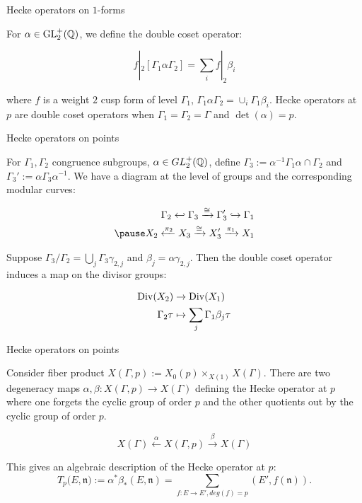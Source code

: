 \begin{frame}{Hecke operators on $1$-forms}

For $\alpha \in \operatorname{GL}_2^+(\mathbb{Q})$, we define the double coset operator:

\[
f|_2 [\Gamma_1 \alpha \Gamma_2] = \sum_i f|_2 \beta_i
\]

where $f$ is a weight $2$ cusp form of level $\Gamma_1$, $\Gamma_1 \alpha \Gamma_2 = \cup_i \Gamma_1 \beta_i$. Hecke operators at $p$ are double coset operators when $\Gamma_1= \Gamma_2 = \Gamma$ and $\det(\alpha) = p$.

\end{frame}

\begin{frame}{Hecke operators on points}

For $\Gamma_1, \Gamma_2$ congruence subgroups, $\alpha \in GL_2^+(\mathbb{Q}) $, define $\Gamma_3 := \alpha^{-1} \Gamma_1 \alpha \cap \Gamma_2$ and $\Gamma_3' := \alpha \Gamma_3 \alpha^{-1}$. \pause We have a diagram at the level of groups and the corresponding modular curves:

\begin{align*}
\Gamma_2 \hookleftarrow \Gamma_3 \xrightarrow{\cong} \Gamma_3' \hookrightarrow \Gamma_1 \\
\pause X_2 \xleftarrow{\pi_2} X_3 \xrightarrow{\cong} X_3' \xrightarrow{\pi_1} X_1
\end{align*}

\pause Suppose $\Gamma_3 / \Gamma_2 = \bigcup_j \Gamma_3 \gamma_{2,j}$ and $\beta_j = \alpha \gamma_{2,j}$. Then the double coset operator induces a map on the divisor groups:

\begin{align*}
    \operatorname{Div}(X_2) &\rightarrow \operatorname{Div}(X_1) \\
    \Gamma_2 \tau &\mapsto \sum_j \Gamma_1 \beta_j \tau
\end{align*}

\end{frame}

\begin{frame}{Hecke operators on points}

Consider fiber product $X(\Gamma, p) := X_0(p) \times_{X(1)} X(\Gamma)$. There are two degeneracy maps $\alpha,\beta: X(\Gamma,p) \rightarrow X(\Gamma)$ defining the Hecke operator at $p$ where one forgets the cyclic group of order $p$ and the other quotients out by the cyclic group of order $p$.

\[
X(\Gamma) \xleftarrow{\alpha} X(\Gamma,p) \xrightarrow{\beta} X(\Gamma)
\]

This gives an algebraic description of the Hecke operator at $p$:
\[
T_p(E,\mathfrak{n)} := \alpha^* \beta_* (E,\mathfrak{n}) = \sum_{f:E\rightarrow E', deg(f) = p} (E',f(\mathfrak{n})).
\]

\end{frame}

